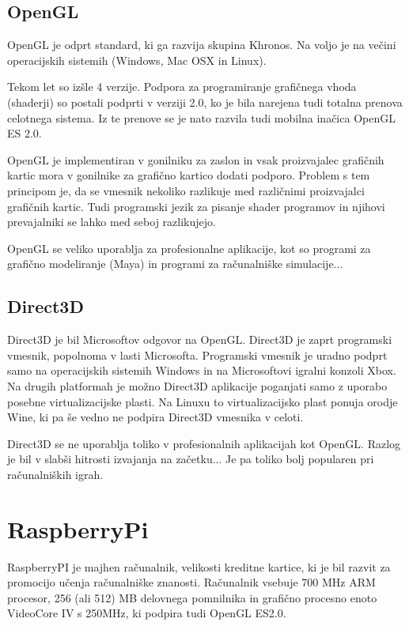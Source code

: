 \subsection{OpenGL}

OpenGL je odprt standard, ki ga razvija skupina Khronos. Na voljo je na večini operacijskih sistemih (Windows, Mac OSX in Linux). 

Tekom let so izšle 4 verzije. Podpora za programiranje grafičnega vhoda (shaderji) so postali podprti v verziji 2.0, ko je bila narejena tudi totalna prenova celotnega sistema. Iz te prenove se je nato razvila tudi mobilna inačica OpenGL ES 2.0.  

OpenGL je implementiran v gonilniku za zaslon in vsak proizvajalec grafičnih kartic mora v gonilnike za grafično kartico dodati podporo. Problem s tem principom je, da se vmesnik nekoliko razlikuje med različnimi proizvajalci grafičnih kartic. Tudi programski jezik za pisanje shader programov in njihovi prevajalniki se lahko med seboj razlikujejo.

OpenGL se veliko uporablja za profesionalne aplikacije, kot so programi za grafično modeliranje (Maya) in programi za računalniške simulacije...

\subsection{Direct3D}

Direct3D je bil Microsoftov odgovor na OpenGL. Direct3D je zaprt programski vmesnik, popolnoma v lasti Microsofta. Programski vmesnik je uradno podprt samo na operacijskih sistemih Windows in na Microsoftovi igralni konzoli Xbox. Na drugih platformah je možno Direct3D aplikacije poganjati samo z uporabo posebne virtualizacijske plasti. Na Linuxu to virtualizacijsko plast ponuja orodje Wine, ki pa še vedno ne podpira Direct3D vmesnika v celoti.

Direct3D se ne uporablja toliko v profesionalnih aplikacijah kot OpenGL. Razlog je bil v slabši hitrosti izvajanja na začetku... Je pa toliko bolj popularen pri računalniških igrah.

\section{RaspberryPi}
\label{sec:raspberryPi}

RaspberryPI je majhen računalnik, velikosti kreditne kartice, ki je bil razvit za promocijo učenja računalniške znanosti. Računalnik vsebuje 700 MHz ARM procesor, 256 (ali 512) MB delovnega pomnilnika in grafično procesno enoto VideoCore IV s 250MHz, ki podpira tudi OpenGL ES2.0.

